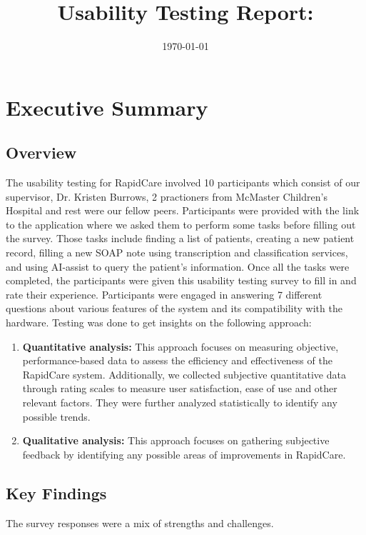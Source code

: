 \documentclass{article}
\title{Usability Testing Report: \progname}
\author{\authname}
\date{\today}
\begin{document}
\newpage

\tableofcontents
\newpage

\section{Executive Summary}

\subsection{Overview}

The usability testing for RapidCare involved 10 participants which consist of our supervisor, Dr. Kristen Burrows, 2 practioners from McMaster Children's Hospital and rest were our fellow peers. Participants were provided with the link to the application where we asked them to perform some tasks before filling out the survey. Those tasks include finding a list of patients, creating a new patient record, filling a new SOAP note using transcription and classification services, and using AI-assist to query the patient's information. Once all the tasks were completed, the participants were given this usability testing survey to fill in and rate their experience. Participants were engaged in answering 7 different questions about various features of the system and its compatibility with the hardware. Testing was done to get insights on the following approach:

\begin{enumerate}
    \item \textbf{Quantitative analysis:} This approach focuses on measuring objective, performance-based data to assess the efficiency and effectiveness of the RapidCare system. Additionally, we collected subjective quantitative data through rating scales to measure user satisfaction, ease of use and other relevant factors. They were further analyzed statistically to identify any possible trends.
    \item \textbf{Qualitative analysis:} This approach focuses on gathering subjective feedback by identifying any possible areas of improvements in RapidCare. 
\end{enumerate}

\subsection{Key Findings}

The survey responses were a mix of strengths and challenges.
\end{document}
